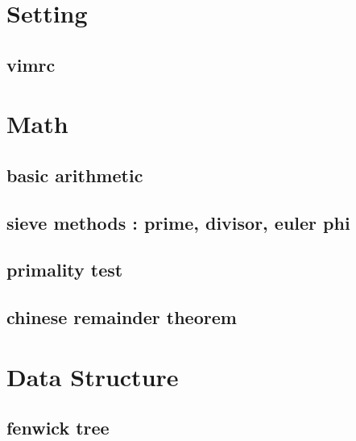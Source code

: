 \documentclass[10pt,landscape,a4paper,twocolumn]{article}
\begin{document}
\section{Setting}
\subsection{vimrc}



\section{Math}

\subsection{basic arithmetic}


\subsection{sieve methods : prime, divisor, euler phi}


\subsection{primality test}


\subsection{chinese remainder theorem}



\section{Data Structure}

\subsection{fenwick tree}
\end{document}
